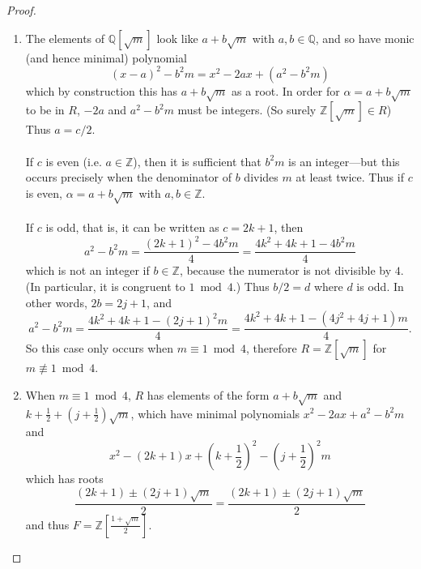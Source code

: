 \documentclass{article}
\newcommand{\paren}[1]{\left( #1 \right)}
\begin{document}
\begin{proof}
  \begin{enumerate}
    \item The elements of $\mathbb Q[\sqrt m]$ look like $a + b\sqrt m$ with
      $a, b \in \mathbb Q$, and so have monic (and hence minimal) polynomial \[
        (x - a)^2 - b^2m = x^2 - 2ax + (a^2 - b^2m)
      \] which by construction this has $a + b\sqrt m$ as a root.
      In order for $\alpha = a + b\sqrt m$ to be in $R$, $-2a$
      and $a^2 - b^2m$ must be integers. (So surely $\mathbb Z[\sqrt m] \in R$)
      Thus $a = c/2$.
      \\~\\
      If $c$ is even (i.e. $a \in \mathbb Z$), then it is sufficient that $b^2m$
      is an integer---but this occurs precisely when the denominator of $b$ divides
      $m$ at least twice. Thus if $c$ is even, $\alpha = a + b\sqrt m$ with
      $a, b \in \mathbb Z$.
      \\~\\
      If $c$ is odd, that is, it can be written as $c = 2k + 1$, then \[
        a^2 - b^2m
        = \frac{(2k + 1)^2 - 4b^2m}{4}
        = \frac{4k^2 + 4k  +  1 - 4b^2m}{4}
      \]  which is not an integer if $b \in \mathbb Z$, because the numerator is
      not divisible by $4$. (In particular, it is congruent to $1 \bmod 4$.)
      Thus $b/2 = d$ where $d$ is odd. In other words, $2b = 2j + 1$, and \[
        a^2 - b^2m
        = \frac{4k^2 + 4k  +  1 - (2j + 1)^2m}{4}
        = \frac{4k^2 + 4k  +  1 - (4j^2 + 4j + 1)m}{4}.
      \]
      So this case only occurs when $m \equiv 1 \bmod 4$, therefore
      $R = \mathbb Z[\sqrt m]$ for $m \not\equiv 1 \bmod 4$.
    \item
      When $m \equiv 1 \bmod 4$, $R$ has elements of the form $a + b\sqrt m$
      and $k + \frac 12 + (j + \frac 12)\sqrt m$, which have minimal polynomials
      $x^2 - 2ax + a^2 - b^2m$ and \[
        x^2 - (2k + 1)x +\paren{k + \frac {1}{2}}^2 - \paren{j +  \frac{1}{2}}^2m
      \] which has roots \[
        \frac{(2k + 1) \pm (2j + 1)\sqrt m}{2}
        = \frac{(2k + 1) \pm (2j + 1)\sqrt m}{2}
      \] and thus $F = \mathbb Z \left[\frac{1 + \sqrt m}{2} \right]$.
  \end{enumerate}


\end{proof}
\end{document}
